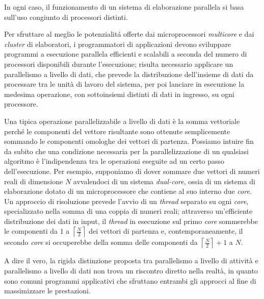 In ogni caso, il funzionamento di un sistema di elaborazione parallela si basa sull'uso congiunto di processori distinti.

Per sfruttare al meglio le potenzialit\'a offerte dai microprocessori \textit{multicore} e dai \textit{cluster} di elaboratori, i programmatori di applicazioni devono sviluppare programmi a esecuzione 
parallela efficienti e scalabili a seconda del numero di processori disponibili durante l'esecuzione; risulta necessario applicare un parallelismo a livello di 
dati, che prevede la distribuzione dell'insieme di dati da processare tra le unit\`a di lavoro del sistema, per poi lanciare in esecuzione la 
medesima operazione, con sottoinsiemi distinti di dati in ingresso, su ogni processore.

Una tipica operazione parallelizzabile a livello di dati \`e la somma vettoriale perch\'e le componenti del vettore risultante sono ottenute
semplicemente sommando le componenti omologhe dei vettori di partenza. \newline
Possiamo intuire fin da subito che una condizione necessaria per la parallelizzazione di un qualsiasi algoritmo \`e l'indipendenza tra le operazioni eseguite ad un certo passo dell'esecuzione.\newline
Per esempio, supponiamo di dover sommare due vettori di numeri reali di dimensione $N$ avvalendoci di un sistema \textit{dual-core}, ossia di un sistema di elaborazione dotato di un microprocessore che contiene al suo interno
due \textit{core}.\newline
Un approccio di risoluzione prevede l'avvio di un \textit{thread} separato su ogni \textit{core}, specializzato nella somma di una coppia di numeri reali; attraverso un'efficiente distribuzione dei dati in input, il \textit{thread} in esecuzione sul primo \textit{core} sommerebbe le componenti da $1$ a $\left\lceil\frac{N}{2}\right\rceil$ dei vettori di partenza
e, contemporaneamente, il secondo \textit{core} si occuperebbe della somma delle componenti da $\left\lceil\frac{N}{2}\right\rceil + 1$ a $N$.

A dire il vero, la rigida distinzione proposta tra parallelismo a livello di attivit\`a e parallelismo a livello di dati non trova un
riscontro diretto nella realt\`a, in quanto sono comuni programmi applicativi che sfruttano entrambi gli approcci al fine di massimizzare le prestazioni.


